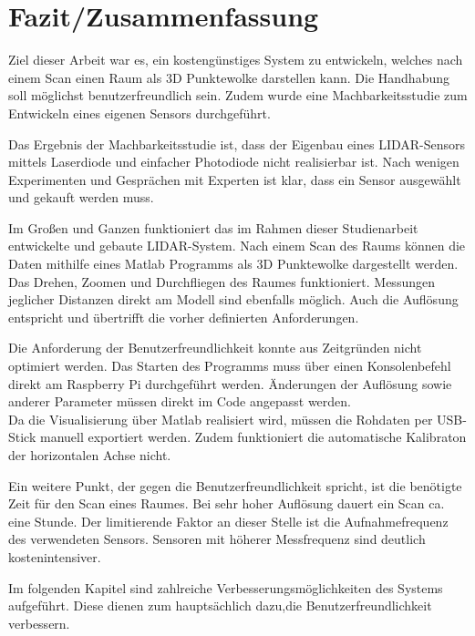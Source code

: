 \chapter{Fazit/Zusammenfassung}\label{chap:fazit}

Ziel dieser Arbeit war es, ein kostengünstiges System zu entwickeln, welches nach einem Scan einen Raum als 3D Punktewolke darstellen kann. Die Handhabung soll möglichst benutzerfreundlich sein. Zudem wurde eine Machbarkeitsstudie zum Entwickeln eines eigenen Sensors durchgeführt.

Das Ergebnis der Machbarkeitsstudie ist, dass der Eigenbau eines \ac{LIDAR}-Sensors mittels Laserdiode und einfacher Photodiode nicht realisierbar ist. Nach wenigen Experimenten und Gesprächen mit Experten ist klar, dass ein Sensor ausgewählt und gekauft werden muss.

Im Großen und Ganzen funktioniert das im Rahmen dieser Studienarbeit entwickelte und gebaute \ac{LIDAR}-System. Nach einem Scan des Raums können die Daten mithilfe eines Matlab Programms als 3D Punktewolke dargestellt werden. Das Drehen, Zoomen und Durchfliegen des Raumes funktioniert. Messungen jeglicher Distanzen direkt am Modell sind ebenfalls möglich. Auch die Auflösung entspricht und übertrifft die vorher definierten Anforderungen.


Die Anforderung der Benutzerfreundlichkeit konnte aus Zeitgründen nicht optimiert werden. Das Starten des Programms muss über einen Konsolenbefehl direkt am Raspberry Pi durchgeführt werden. Änderungen der Auflösung sowie anderer Parameter müssen direkt im Code angepasst werden.\\
Da die Visualisierung über Matlab realisiert wird, müssen die Rohdaten per USB-Stick manuell exportiert werden. Zudem funktioniert die automatische Kalibraton der horizontalen Achse nicht.

Ein weitere Punkt, der gegen die Benutzerfreundlichkeit spricht, ist die benötigte Zeit für den Scan eines Raumes. Bei sehr hoher Auflösung dauert ein Scan ca. eine Stunde. Der limitierende Faktor an dieser Stelle ist die Aufnahmefrequenz des verwendeten Sensors. Sensoren mit höherer Messfrequenz sind deutlich kostenintensiver.

Im folgenden Kapitel sind zahlreiche Verbesserungsmöglichkeiten des Systems aufgeführt. Diese dienen zum hauptsächlich dazu,die Benutzerfreundlichkeit verbessern.


